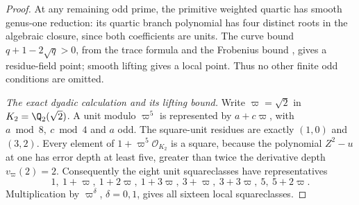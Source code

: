\begin{proof}
At any remaining odd prime, the primitive weighted
quartic has smooth genus-one reduction: its quartic
branch polynomial has four distinct roots in the
algebraic closure, since both coefficients are units.
The curve bound
\(q+1-2\sqrt q>0\), from the trace formula and
the Frobenius bound
\cite[(1.5.1), Theorem (1.6)]{AgentDeligneWeilI},
gives a residue-field point; smooth lifting gives a
local point.  Thus no other finite odd conditions
are omitted.

\emph{The exact dyadic calculation and its lifting bound.}
Write \(\varpi=\sqrt2\) in \(K_2=\Q_2(\sqrt2)\).
A unit modulo \(\varpi^5\) is represented by
\(a+c\varpi\), with \(a\bmod8,\ c\bmod4\) and \(a\) odd.
The square-unit residues are exactly
\((1,0)\) and \((3,2)\).
Every element of \(1+\varpi^5\mathcal O_{K_2}\) is a
square, because the polynomial \(Z^2-u\) at one has
error depth at least five, greater than twice the
derivative depth \(v_\varpi(2)=2\).
Consequently the eight unit squareclasses have representatives
\[
        1,\ 1+\varpi,\ 1+2\varpi,\ 1+3\varpi,\
        3+\varpi,\ 3+3\varpi,\ 5,\ 5+2\varpi .
\tag{A.150.25}
\]
Multiplication by \(\varpi^\delta\), \(\delta=0,1\),
gives all sixteen local squareclasses.


\end{proof}

